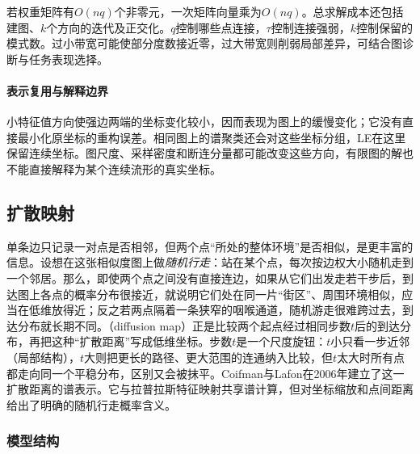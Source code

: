 若权重矩阵有$O(nq)$个非零元，一次矩阵向量乘为$O(nq)$。总求解成本还包括建图、$k$个方向的迭代及正交化。$q$控制哪些点连接，$\tau$控制连接强弱，$k$控制保留的模式数。过小带宽可能使部分度数接近零，过大带宽则削弱局部差异，可结合图诊断与任务表现选择。

\paragraph{表示复用与解释边界}

小特征值方向使强边两端的坐标变化较小，因而表现为图上的缓慢变化；它没有直接最小化原坐标的重构误差。相同图上的谱聚类还会对这些坐标分组，LE在这里保留连续坐标。图尺度、采样密度和断连分量都可能改变这些方向，有限图的解也不能直接解释为某个连续流形的真实坐标。



\subsection{扩散映射}
\label{sec:dim-diffusion}

单条边只记录一对点是否相邻，但两个点“所处的整体环境”是否相似，是更丰富的信息。设想在这张相似度图上做\emph{随机行走}：站在某个点，每次按边权大小随机走到一个邻居。那么，即使两个点之间没有直接连边，如果从它们出发走若干步后，到达图上各点的概率分布很接近，就说明它们处在同一片“街区”、周围环境相似，应当在低维放得近；反之若两点隔着一条狭窄的咽喉通道，随机游走很难跨过去，到达分布就长期不同。（diffusion map）正是比较两个起点经过相同步数$t$后的到达分布，再把这种“扩散距离”写成低维坐标。步数$t$是一个尺度旋钮：$t$小只看一步近邻（局部结构），$t$大则把更长的路径、更大范围的连通纳入比较，但$t$太大时所有点都走向同一个平稳分布，区别又会被抹平。Coifman与Lafon在2006年建立了这一扩散距离的谱表示。它与拉普拉斯特征映射共享谱计算，但对坐标缩放和点间距离给出了明确的随机行走概率含义。

\subsubsection{模型结构}

